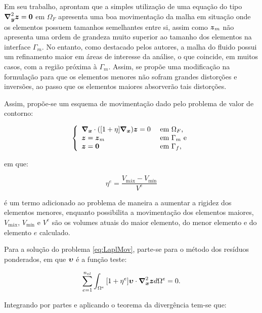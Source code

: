 Em seu trabalho,  aprontam que a simples utilização de uma equação do tipo $\boldsymbol{\nabla}^2_{\boldsymbol{y}}\boldsymbol{z}=\boldsymbol{0}$ em $\Omega_F$ apresenta uma boa movimentação da malha em situação onde os elementos possuem tamanhos semelhantes entre si, assim como $\boldsymbol{z}_m$ não apresenta uma ordem de grandeza muito superior ao tamanho dos elementos na interface $\Gamma_m$. No entanto, como destacado pelos autores, a malha do fluido possui um refinamento maior em áreas de interesse da análise, o que coincide, em muitos casos, com a região próxima à $\Gamma_m$. Assim, se propõe uma modificação na formulação para que os elementos menores não sofram grandes distorções e inversões, ao passo que os elementos maiores absorverão tais distorções.

Assim, propõe-se um esquema de movimentação dado pelo problema de valor de contorno:

\begin{equation}
    \left\{
    \begin{array}{ll}
        \boldsymbol{\nabla_x}\cdot([1+\eta]\boldsymbol{\nabla_x})\boldsymbol{z}=0 & \text{ em }\Omega_F\text{,}  \\
        \boldsymbol{z}=\boldsymbol{z}_m               & \text{ em }\Gamma_m\text{ e} \\
        \boldsymbol{z}=\boldsymbol{0}                 & \text{ em }\Gamma_f\text{,}
    \end{array}
    \right.\label{eq:LaplMov}
\end{equation}

\noindent em que:

\begin{equation}
    \eta^e=\frac{V_\mathrm{máx}-V_\mathrm{mín}}{V^e}
    \label{eq:movStiff}
\end{equation}

\noindent é um termo adicionado ao problema de maneira a aumentar a rigidez dos elementos menores, enquanto possibilita a movimentação dos elementos maiores, $V_\mathrm{máx}$, $V_\mathrm{mín}$ e $V^e$ são os volumes atuais do maior elemento, do menor elemento e do elemento $e$ calculado.

Para a solução do problema \eqref{eq:LaplMov}, parte-se para o método dos resíduos ponderados, em que $\boldsymbol{\upsilon}$ é a função teste:

\begin{equation}
    \sum_{e=1}^{n_{el}}{\int_{\Omega^e}{[1+\eta^e]\boldsymbol{\upsilon}\cdot\boldsymbol{\nabla}^2_{\boldsymbol{x}}\boldsymbol{z} d\Omega^e}}=0\text{.}
\end{equation}

Integrando por partes e aplicando o teorema da divergência tem-se que:

